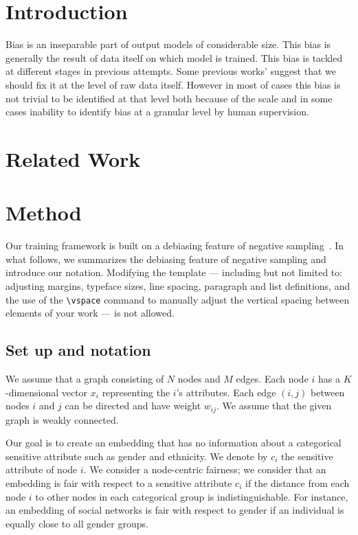 \documentclass[sigconf,authordraft]{acmart}
\begin{document}
\maketitle

\section{Introduction}
Bias is an inseparable part of output models of considerable size. This bias is generally the result of data itself on which model is trained. This bias is tackled at different stages in previous attempts. Some previous works' suggest that we should fix it at the level of raw data itself. However in most of cases this bias is not trivial to be identified at that level both because of the scale and in some cases inability to identify bias at a granular level by human supervision.
\section{Related Work}

\section{Method}

Our training framework is built on a debiasing feature of negative sampling~\cite{kojaku_residual2vec_2021}. In what follows, we summarizes the debiasing feature of negative sampling and introduce our notation.
Modifying the template --- including but not limited to: adjusting
margins, typeface sizes, line spacing, paragraph and list definitions,
and the use of the \verb|\vspace| command to manually adjust the
vertical spacing between elements of your work --- is not allowed.



\subsection{Set up and notation}
We assume that a graph consisting of $N$ nodes and $M$ edges. Each node $i$ has a $K$-dimensional vector $x_i$ representing the $i$'s attributes. Each edge $(i,j)$ between nodes $i$ and $j$ can be directed and have weight $w_{ij}$. We assume that the given graph is weakly connected.

Our goal is to create an embedding that has no information about a categorical sensitive attribute such as gender and ethnicity. We denote by $c_i$ the sensitive attribute of node $i$. We consider a node-centric fairness; we consider that an embedding is fair with respect to a sensitive attribute $c_i$ if the distance from each node $i$ to other nodes in each categorical group is indistinguishable. For instance, an embedding of social networks is fair with respect to gender if an individual is equally close to all gender groups.
\end{document}
